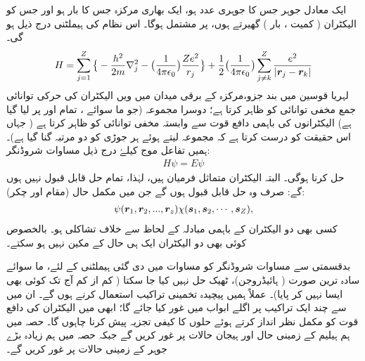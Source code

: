 ایک معادل جوہر جس کا جوہری عدد  ہو، ایک بھاری مرکزہ جس کا بار  ہو اور جس کو  الیکٹران ( کمیت ، بار ) گھیرتے ہوں، پر مشتمل ہوگا۔ اس نظام کی ہیملٹنی درج ذیل ہو گی۔
\begin{align}\label{مساوات_متماثل_ہیملٹنی_جوہر_عمومی}
H=\sum_{j=1}^{Z} \big\{ -\frac{h^2}{2m}\nabla_j^2-\big(\frac{1}{4\pi\epsilon_{0}}\big) \frac{Ze^2}{r_{j}} \big\} + \frac{1}{2}\big(\frac{1}{4\pi\epsilon_{0}}\big) \sum_{j\ne k}^{Z} \frac{e^2}{|{{\boldsymbol{r}}}_{j} - {{\boldsymbol{r}}}_{k} |}
\end{align}
لہریا قوسین میں بند جزو،مرکزہ کے برقی میدان میں  ویں الیکٹران کی حرکی توانائی جمع مخفی توانائی کو ظاہر کرتا ہے؛ دوسرا مجموعہ (جو ما سوائے ، تمام  اور  پر لیا گیا ہے) الیکٹرانوں کی باہمی دافع قوت سے وابستہ مخفی توانائی کو ظاہر کرتا ہے ( جہاں  اس حقیقت کو درست کرتا ہے کہ مجموعہ لیتے ہوئے ہر جوڑی کو دو مرتبہ گنا گیا ہے)۔ ہمیں 
 تفاعل موج  کیلۓ درج ذیل مساوات شروڈنگر:
\begin{align}\label{مساوات_متماثل_شروڈنگر_عمومی_جوہر}
 H\psi=E\psi
\end{align}
 حل کرنا ہوگی۔ البتہ الیکٹران متماثل فرمیان ہیں، لہٰذا، تمام حل قابل قبول نہیں ہوں گے: صرف وہ حل قابل قبول ہوں گے جن میں مکمل حال (مقام اور چکر):
\begin{align}
 \psi({{\boldsymbol{r}}}_{1},{{\boldsymbol{r}}}_{2},...,{{\boldsymbol{r}}}_{z}) \chi({{\boldsymbol{s}}}_{1},{{\boldsymbol{s}}}_{2},\cdots,{{\boldsymbol{s}}}_{Z}), 
\end{align}
کسی بھی دو الیکٹران کے باہمی مبادلہ کے لحاظ سے خلاف تشاکلی ہو۔ بالخصوص کوئی بھی دو الیکٹران ایک ہی حال کے مکین نہیں ہو سکتے۔

 بدقسمتی سے مساوات شروڈنگر کو مساوات  میں دی گئی ہیملٹنی کے لئے، ما سوائے سادہ ترین صورت ( ہائیڈروجن)، ٹھیک حل نہیں کیا جا سکتا ( کم از کم آج تک کوئی بھی ایسا نہیں کر پایا)۔ عملاً ہمیں پیچیدہ تخمینی تراکیب استعمال کرنے ہوں گے۔ ان میں سے چند ایک تراکیب پر اگلے ابواب میں غور کیا جائے گا؛ ابھی میں الیکٹران کی دافع قوت کو مکمل نظر انداز کرتے ہوئے حلوں کا کیفی تجزیہ پیش کرنا چاہوں گا۔ حصہ  میں ہم ہیلیم کے زمینی حال اور ہیجان حالات پر غور کریں گے جبکہ حصہ  میں ہم زیادہ بڑے جوہر کے زمینی حالات پر غور کریں گے۔

